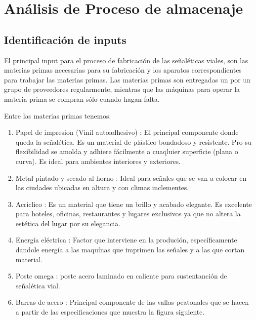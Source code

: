 \section{Análisis de Proceso de almacenaje}
	\subsection{Identificación de inputs}

	El principal input para el proceso de fabricación de las señaléticas viales, son las materias primas necesarias para su fabricación y los aparatos correspondientes para trabajar las materias primas. Las materias primas son entregadas un por un grupo de proveedores regularmente, mientras que las máquinas para operar la materia prima se compran sólo cuando hagan falta.
	
	Entre las materias primas tenemos:
	
    \begin{enumerate}[1)]
    \item Papel de impresion (Vinil autoadhesivo) : El principal componente donde queda la señalética. Es un material de plástico bondadoso y resistente. Pro su flexibilidad se amolda y adhiere fácilmente a cuaqluier superficie (plana o curva). Es ideal para ambientes interiores y exteriores.
    \item Metal pintado y secado al horno : Ideal para señales que se van a colocar en las ciudades ubicadas en altura y con climas inclementes.
    \item Acríclico : Es un material que tiene un brillo y acabado elegante. Es excelente para hoteles, oficinas, restaurantes y lugares exclusivos ya que no altera la estética del lugar por su elegancia.
    \item Energía eléctrica : Factor que interviene en la produción, específicamente dandole energía a las maquínas que imprimen las señales y a las que cortan material.
    \item Poste omega :  poste acero laminado en caliente para sustentanción de señalética vial.
    \item Barras de acero : Principal componente de las vallas peatonales que se hacen a partir de las especificaciones que muestra la figura siguiente.
    \newpage
    \end{enumerate}

